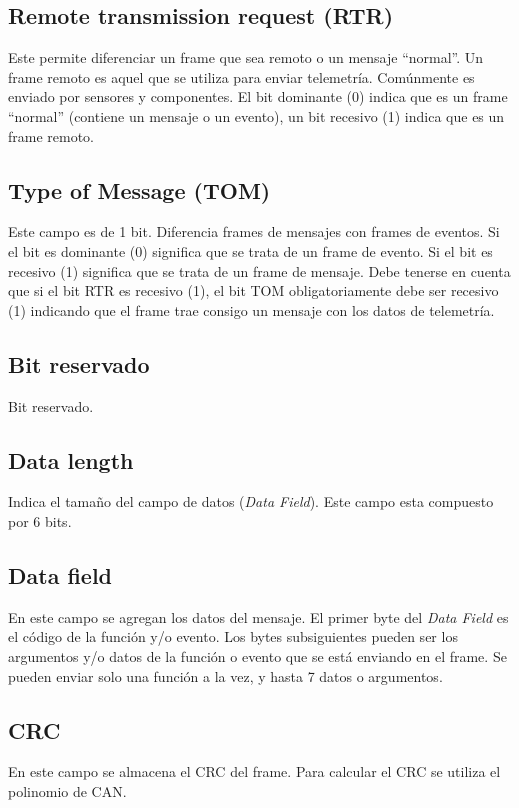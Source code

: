 \subsection{Remote transmission request (RTR)}
Este permite diferenciar un frame que sea remoto o un mensaje ``normal''. Un
frame remoto es aquel que se utiliza para enviar telemetría. Comúnmente es
enviado por sensores y componentes. El bit dominante (0) indica que es un frame
``normal'' (contiene un mensaje o un evento), un bit recesivo (1) indica que es
un frame remoto.

\subsection{Type of Message (TOM)}
Este campo es de 1 bit. Diferencia frames de mensajes con frames de eventos.
Si el bit es dominante (0) significa que se trata de un frame de evento. Si el
bit es recesivo (1) significa que se trata de un frame de mensaje. Debe tenerse
en cuenta que si el bit RTR es recesivo (1), el bit TOM obligatoriamente debe
ser recesivo (1) indicando que el frame trae consigo un mensaje con los datos de
telemetría.

\subsection{Bit reservado}
Bit reservado.

\subsection{Data length}
Indica el tamaño del campo de datos (\textit{Data Field}). Este campo esta
compuesto por 6 bits. 

\subsection{Data field}
En este campo se agregan los datos del mensaje. El primer byte del
\textit{Data Field} es el código de la función y/o evento. Los bytes
subsiguientes pueden ser los argumentos y/o datos de la función o evento que se
está enviando en el frame. Se pueden enviar solo una función a la vez, y hasta 7
datos o argumentos. 

\subsection{CRC}
En este campo se almacena el CRC del frame. Para calcular el CRC se utiliza el
polinomio de CAN.

